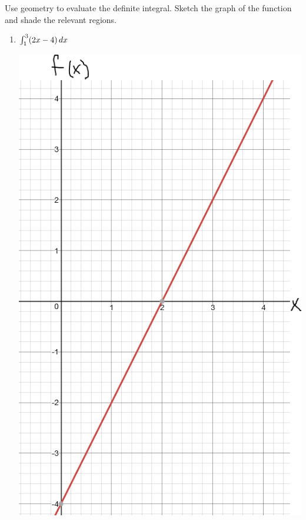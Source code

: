 \documentclass[ nooutcomes]{ximera}
\begin{document}
\begin{problem}
Use geometry to evaluate the definite integral.  Sketch the graph of the function and shade the relevant regions.
\begin{enumerate}


\item $\int_1^3 (2x-4) \,d x$

\begin{freeResponse}
\begin{image}
\includegraphics[scale=.4]{figure2.png}

\end{image}
\end{freeResponse}
\end{enumerate}
\end{problem}
\end{document}
